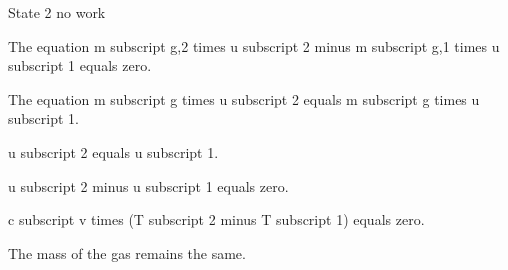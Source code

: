 State 2 no work

The equation m subscript g,2 times u subscript 2 minus m subscript g,1 times u subscript 1 equals zero.

The equation m subscript g times u subscript 2 equals m subscript g times u subscript 1.

u subscript 2 equals u subscript 1.

u subscript 2 minus u subscript 1 equals zero.

c subscript v times (T subscript 2 minus T subscript 1) equals zero.

The mass of the gas remains the same.